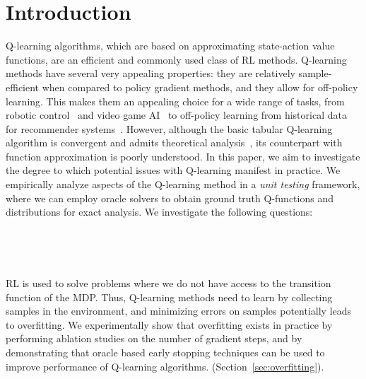 \section{Introduction}
Q-learning algorithms, which are based on approximating state-action value functions, are an efficient and commonly used class of RL methods. Q-learning methods have several very appealing properties: they are relatively sample-efficient when compared to policy gradient methods, and they allow for off-policy learning. This makes them an appealing choice for a wide range of tasks, from robotic control~\citep{kalashnikov18} and video game AI~\citep{Mnih2015} to off-policy learning from historical data for recommender systems~\citep{shani2005recommender}. However, although the basic tabular Q-learning algorithm is convergent and admits theoretical analysis~\cite{suttonrlbook}, its counterpart with function approximation is poorly understood. 
In this paper, we aim to investigate the degree to which potential issues with Q-learning manifest in practice. 
We empirically analyze aspects of the Q-learning method in a \emph{unit testing} framework, where we can employ oracle solvers to obtain ground truth Q-functions and distributions for exact analysis. We investigate the following questions:


~


~

RL is used to solve problems where we do not have access to the transition function of the MDP. Thus, Q-learning methods need to learn by collecting samples in the environment, and minimizing errors on samples potentially leads to overfitting. We experimentally show that overfitting exists in practice by performing ablation studies on the number of gradient steps, and by demonstrating that oracle based early stopping techniques can be used to improve performance of Q-learning algorithms. (Section~\ref{sec:overfitting}).


